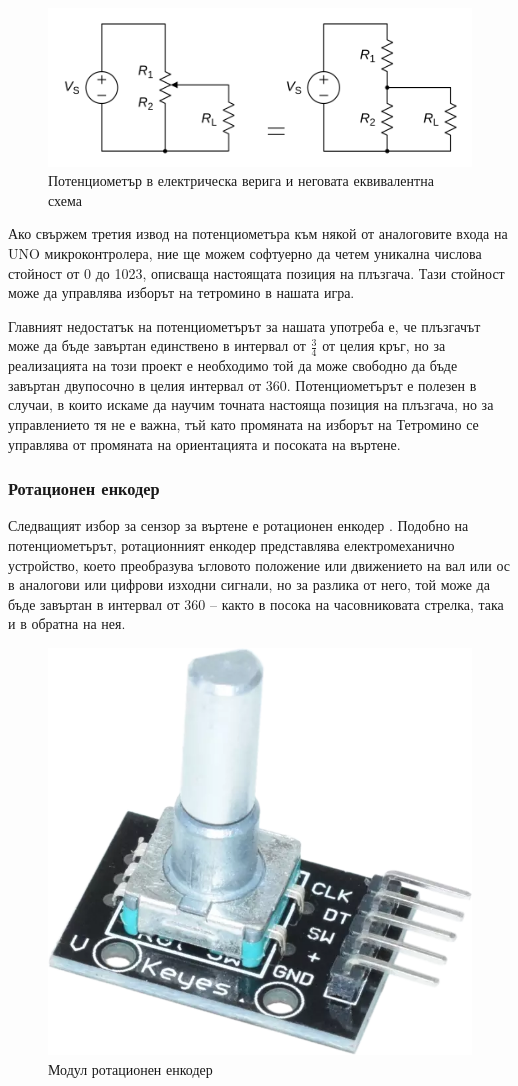 \documentclass[titlepage, oneside, 14pt]{extbook}
\begin{document}
\begin{figure}[!htbp]
    \centering
    \includegraphics[width=0.7\linewidth]{img/potentiometer_circuit.png}
    \caption{Потенциометър в електрическа верига и неговата еквивалентна схема}
    \label{potentiometer_circuit}
\end{figure}


Ако свържем третия извод на потенциометъра към някой от аналоговите входа на UNO микроконтролера,
ние ще можем софтуерно да четем уникална числова стойност от 0 до 1023, описваща настоящата позиция
на плъзгача. Тази стойност може да управлява изборът на тетромино в нашата игра.

Главният недостатък на потенциометърът за нашата употреба е, че плъзгачът може да бъде завъртан
единствено в интервал от $\frac{3}{4}$ от целия кръг, но за реализацията на този проект е необходимо
той да може свободно да бъде завъртан двупосочно в целия интервал от
360\textdegree{}. Потенциометърът е полезен в случаи, в които искаме да научим точната настояща позиция
на плъзгача, но за управлението тя не е важна, тъй като промяната на изборът на Тетромино се управлява
от промяната на ориентацията и посоката на въртене.

\subsubsection{Ротационен енкодер}

Следващият избор за сензор за въртене е ротационен енкодер \cite{encodertut}. Подобно на потенциометърът, ротационният енкодер представлява
електромеханично устройство, което преобразува ъгловото положение или движението на вал или ос
в аналогови или цифрови изходни сигнали, но за разлика от него, той може да
бъде завъртан в интервал от 360\textdegree{} -- както в посока на часовниковата
стрелка, така и в обратна на нея.

\begin{figure}[!htbp]
    \centering
    \includegraphics[width=0.5\linewidth]{img/encoder.png}
    \caption{Модул ротационен енкодер}
\end{figure}
\end{document}
